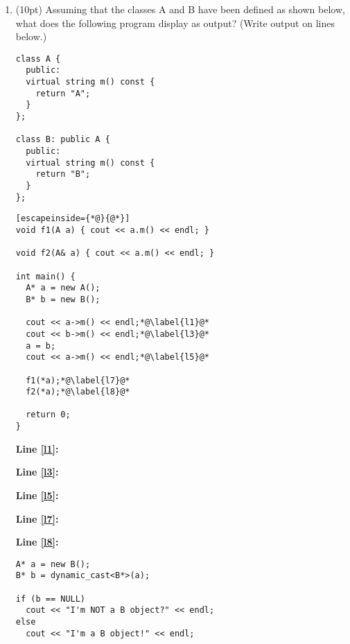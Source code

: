 \documentclass{article}
\newcommand*{\pts}[1]{\addtocounter{points}{#1}(#1pt)}
\begin{document}
\begin{spacing}{1.4}
\begin{enumerate}[leftmargin=*]
\vspace{7cm}

\newpage

\item\label{ab} \pts{10} Assuming that the classes A and B have been defined as
  shown below, what does the following program display as output?
  (Write output on lines below.) 

\begin{multicols}{2}
\begin{lstlisting}[numbers=none,frame=none]
class A {
  public:
  virtual string m() const {
    return "A";
  }
};

class B: public A {
  public:
  virtual string m() const {
    return "B";
  }
};
\end{lstlisting}
\end{multicols}
\begin{lstlisting}[escapeinside={*@}{@*}]
void f1(A a) { cout << a.m() << endl; }

void f2(A& a) { cout << a.m() << endl; } 

int main() {
  A* a = new A();
  B* b = new B();

  cout << a->m() << endl;*@\label{l1}@*
  cout << b->m() << endl;*@\label{l3}@*
  a = b;
  cout << a->m() << endl;*@\label{l5}@*
  
  f1(*a);*@\label{l7}@*
  f2(*a);*@\label{l8}@*

  return 0; 
}
\end{lstlisting}

\newcommand{\lin}[1]{
\par\smallskip\noindent\parbox[t]{.09\textwidth}{\raggedright\textbf{Line #1:}}
 \parbox[t]{.3\textwidth}{\raggedleft\hrulefill}\par\smallskip\vspace{1em}
}%

\begin{multicols}{2}

\lin{\ref{l1}}

\lin{\ref{l3}}

\lin{\ref{l5}}

\lin{\ref{l7}}

\lin{\ref{l8}}

\end{multicols}

\newpage

\begin{lstlisting}
A* a = new B();
B* b = dynamic_cast<B*>(a);

if (b == NULL)
  cout << "I'm NOT a B object?" << endl;
else
  cout << "I'm a B object!" << endl;
\end{lstlisting}


\end{enumerate}
\end{spacing}
\end{document}
